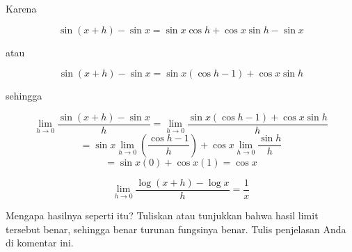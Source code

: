 \documentclass[a4paper,11pt,oneside,enabledeprecatedfontcommands]{scrbook}
\newenvironment{eulernotebook}{}{}
\newenvironment{eulercomment}{\par\medskip\noindent}{\par\medskip}
\newenvironment{eulerformula}{}{}
\begin{document}
\begin{eulernotebook}
\begin{eulercomment}
Karena
\end{eulercomment}
\begin{eulerformula}
\[
\sin(x+h)-\sin x= \sin x\cos h+\cos x\sin h-\sin x
\]
\end{eulerformula}
\begin{eulercomment}
atau
\end{eulercomment}
\begin{eulerformula}
\[
\sin(x+h)-\sin x=\sin x(\cos h-1)+\cos x\sin h
\]
\end{eulerformula}
\begin{eulercomment}
sehingga
\end{eulercomment}
\begin{eulerformula}
\[
\lim_{h \to 0} \frac{\sin(x+h)-\sin x}{h}=\lim_{h \to 0} \frac{\sin x(\cos h-1)+\cos x\sin h}{h}
\]
\end{eulerformula}
\begin{eulerformula}
\[
=\sin x \lim_{h \to 0} \left(\frac{\cos h-1}{h}\right) + \cos x \lim_{h \to 0} \frac{\sin h}{h}
\]
\end{eulerformula}
\begin{eulerformula}
\[
=\sin x(0)+\cos x(1) = \cos x
\]
\end{eulerformula}
\begin{eulerformula}
\[
\lim_{h\rightarrow 0}{\frac{\log \left(x+h\right)-\log x}{h}}=  \frac{1}{x}
\]
\end{eulerformula}
\begin{eulercomment}
Mengapa hasilnya seperti itu? Tuliskan atau tunjukkan bahwa hasil limit tersebut benar, sehingga benar turunan fungsinya benar. Tulis penjelasan Anda di komentar ini.


\end{eulercomment}
\end{eulernotebook}
\end{document}
